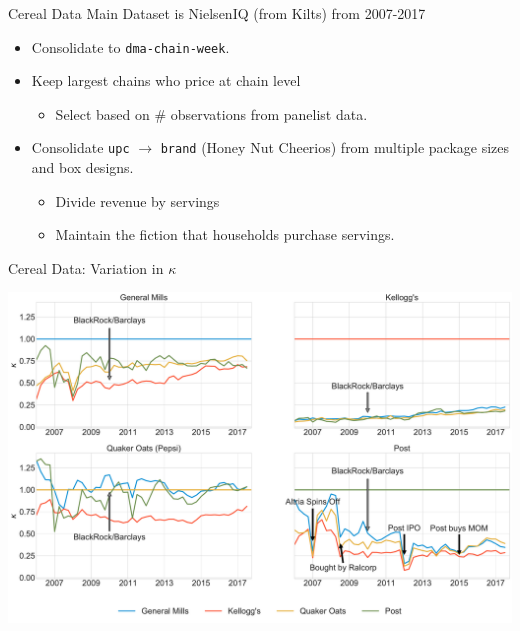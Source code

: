 \documentclass[handout, serif, aspectratio=169, 10pt]{beamer}
\begin{document}
\begin{frame}{Cereal Data}
Main Dataset is NielsenIQ (from Kilts) from 2007-2017
\begin{itemize}
\item Consolidate to \texttt{dma-chain-week}.
\item Keep largest chains who price at chain level
\begin{itemize}
\item Select based on \# observations from panelist data.
\end{itemize}    
\item Consolidate \texttt{upc} $\rightarrow$ \texttt{brand} (Honey Nut Cheerios) from multiple package sizes and box designs.
\begin{itemize}
\item Divide revenue by servings
\item Maintain the fiction that households purchase servings.
\end{itemize}
\end{itemize}
\end{frame}


\begin{frame}[plain]{Cereal Data: Variation in $\kappa$}
\begin{center}
\includegraphics[height = 0.9\textheight ]{figures/cereal_kappas_alpha_1.pdf}
\end{center}
\end{frame}
\end{document}
